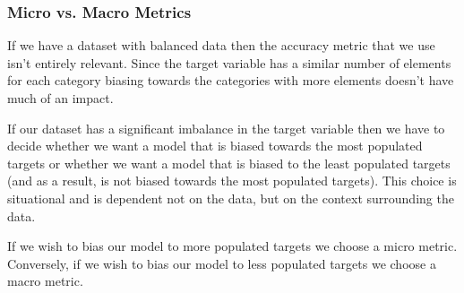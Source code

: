\documentclass{article}
\begin{document}
\subsubsection{Micro vs. Macro Metrics}
If we have a dataset with balanced data then the accuracy metric that we use isn't entirely relevant. Since the target variable has a similar number of elements for each category biasing towards the categories with more elements doesn't have much of an impact.

\vspace{3mm}
\noindent
If our dataset has a significant imbalance in the target variable then we have to decide whether we want a model that is biased towards the most populated targets or whether we want a model that is biased to the least populated targets (and as a result, is not biased towards the most populated targets). This choice is situational and is dependent not on the data, but on the context surrounding the data. 

If we wish to bias our model to more populated targets we choose a micro metric. Conversely, if we wish to bias our model to less populated targets we choose a macro metric. 

\subsubsection{}


        
        
    
                    
                    
        
\end{document}
